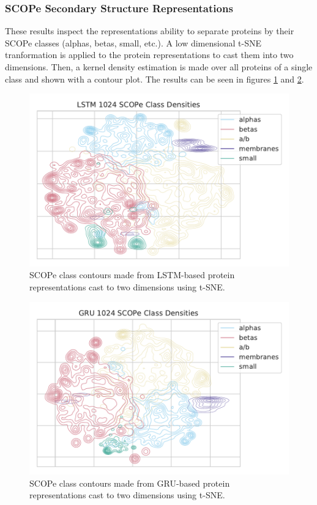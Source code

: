 \documentclass[a4paper,12pt]{article}
\begin{document}
\subsubsection{SCOPe Secondary Structure Representations}
\label{section:SCOPe}
These results inspect the representations ability to separate proteins by their SCOPe classes (alphas, betas, small, etc.). A low dimensional t-SNE tranformation is applied to the protein representations to cast them into two dimensions. Then, a kernel density estimation is made over all proteins of a single class and shown with a contour plot. The results can be seen in figures \ref{fig:fig2c_LSTM} and \ref{fig:fig2c_GRU}.
\begin{figure}[H]
    \centering
    \includegraphics[width=\linewidth]{figures/fig2c_LSTM_1024_no_trunc.pdf}
    \caption{SCOPe class contours made from LSTM-based protein representations cast to two dimensions using t-SNE.}
    \label{fig:fig2c_LSTM}
\end{figure}
\begin{figure}[H]
    \centering
    \includegraphics[width=\linewidth]{figures/fig2c_GRU_1024_no_trunc.pdf}
    \caption{SCOPe class contours made from GRU-based protein representations cast to two dimensions using t-SNE.}
    \label{fig:fig2c_GRU}
\end{figure}
\end{document}
